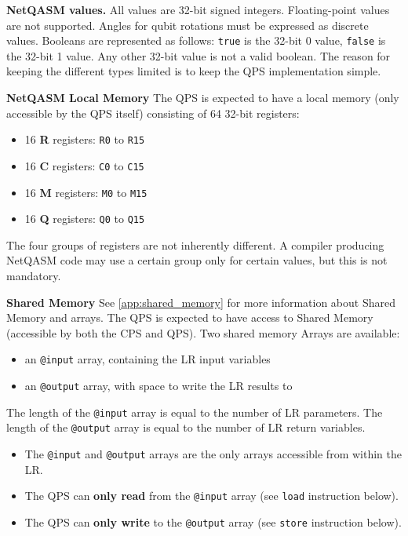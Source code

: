 \textbf{NetQASM values.}
All values are 32-bit signed integers. Floating-point values are not supported. Angles for qubit rotations must be expressed as discrete values.
Booleans are represented as follows: \texttt{true} is the 32-bit 0 value, \texttt{false} is the 32-bit 1 value. Any other 32-bit value is not a valid boolean.
The reason for keeping the different types limited is to keep the QPS implementation simple.


\textbf{NetQASM Local Memory}
The QPS is expected to have a local memory (only accessible by the QPS itself) consisting of 64 32-bit registers:
\begin{itemize}
\item 16 \textbf{R} registers: \texttt{R0} to \texttt{R15}
\item 16 \textbf{C} registers: \texttt{C0} to \texttt{C15}
\item 16 \textbf{M} registers: \texttt{M0} to \texttt{M15}
\item 16 \textbf{Q} registers: \texttt{Q0} to \texttt{Q15}
\end{itemize}

The four groups of registers are not inherently different. A compiler producing NetQASM code may use a certain group only for certain values, but this is not mandatory.

\textbf{Shared Memory}
See \cref{app:shared_memory} for more information about Shared Memory and arrays.
The QPS is expected to have access to Shared Memory (accessible by both the CPS and QPS).
Two shared memory Arrays are available:
\begin{itemize}
\item an \texttt{@input} array, containing the LR input variables
\item an \texttt{@output} array, with space to write the LR results to
\end{itemize}

The length of the \texttt{@input} array is equal to the number of LR parameters.
The length of the \texttt{@output} array is equal to the number of LR return variables.

\begin{itemize}
\item The \texttt{@input} and \texttt{@output} arrays are the only arrays accessible from within the LR.
\item The QPS can \textbf{only read} from the \texttt{@input} array (see \texttt{load} instruction below).
\item The QPS can \textbf{only write} to the \texttt{@output} array (see \texttt{store} instruction below).
\end{itemize}

